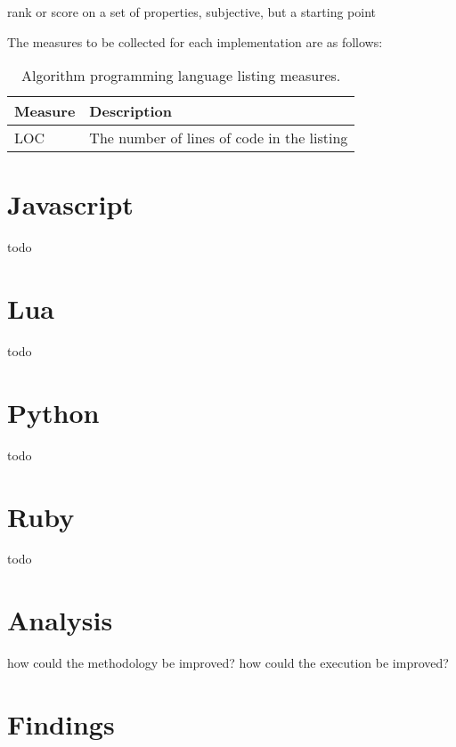 \documentclass[a4paper, 11pt]{article}
\begin{document}
rank or score on a set of properties, subjective, but a starting point

The measures to be collected for each implementation are as follows:

\begin{table}[ht]
	\centering
		\begin{tabularx}{\textwidth}{lX}
		\toprule
		\textbf{Measure} & \textbf{Description} \\ 
		\toprule
		LOC & The number of lines of code in the listing \\
		\bottomrule
		\end{tabularx}	
	\caption{Algorithm programming language listing measures.}
	\label{tab:measures}
\end{table}


% 
% 
\section{Javascript}
\label{sec:javascript}
todo


% 
% 
\section{Lua}
\label{sec:lua}
todo


% 
% 
\section{Python}
\label{sec:python}
todo


% 
% 
\section{Ruby}
\label{sec:ruby}
todo


% 
% 
\section{Analysis}
\label{sec:analysis}

how could the methodology be improved?
how could the execution be improved?


% 
% 
\section{Findings}
\label{sec:findings}






\end{document}
